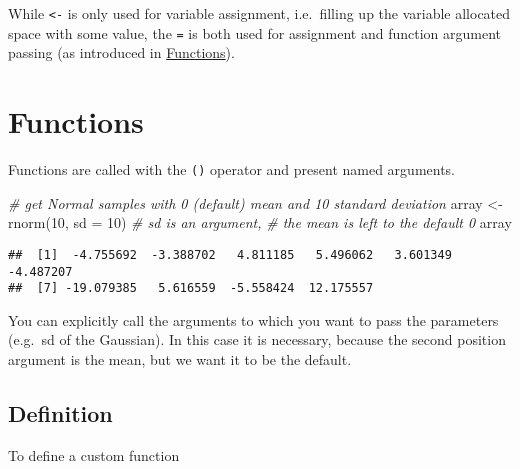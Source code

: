 \documentclass[
  oneside]{book}
\newenvironment{Shaded}{\begin{snugshade}}{\end{snugshade}}
\newcommand{\AttributeTok}[1]{\textcolor[rgb]{0.77,0.63,0.00}{#1}}
\newcommand{\CommentTok}[1]{\textcolor[rgb]{0.56,0.35,0.01}{\textit{#1}}}
\newcommand{\DecValTok}[1]{\textcolor[rgb]{0.00,0.00,0.81}{#1}}
\newcommand{\FunctionTok}[1]{\textcolor[rgb]{0.00,0.00,0.00}{#1}}
\newcommand{\NormalTok}[1]{#1}
\newcommand{\OtherTok}[1]{\textcolor[rgb]{0.56,0.35,0.01}{#1}}
\begin{document}
While \texttt{\textless{}-} is only used for variable assignment, i.e.~filling up the variable
allocated space with some value, the \texttt{=} is both used for assignment and
function argument passing (as introduced in \protect\hyperlink{functions}{Functions}).

\hypertarget{functions}{%
\section{Functions}\label{functions}}

Functions are called with the \texttt{()} operator and present named arguments.

\begin{Shaded}
\begin{Highlighting}[]
\CommentTok{\# get Normal samples with 0 (default) mean and 10 standard deviation}
\NormalTok{array }\OtherTok{\textless{}{-}} \FunctionTok{rnorm}\NormalTok{(}\DecValTok{10}\NormalTok{, }\AttributeTok{sd =} \DecValTok{10}\NormalTok{) }\CommentTok{\# sd is an argument,}
                            \CommentTok{\# the mean is left to the default 0}
\NormalTok{array}
\end{Highlighting}
\end{Shaded}

\begin{verbatim}
##  [1]  -4.755692  -3.388702   4.811185   5.496062   3.601349  -4.487207
##  [7] -19.079385   5.616559  -5.558424  12.175557
\end{verbatim}

You can explicitly call the arguments to which you want to pass the parameters
(e.g.~sd of the Gaussian). In this case it is necessary, because the second
position argument is the mean, but we want it to be the default.

\hypertarget{definition}{%
\subsection{Definition}\label{definition}}

To define a custom function
\end{document}
